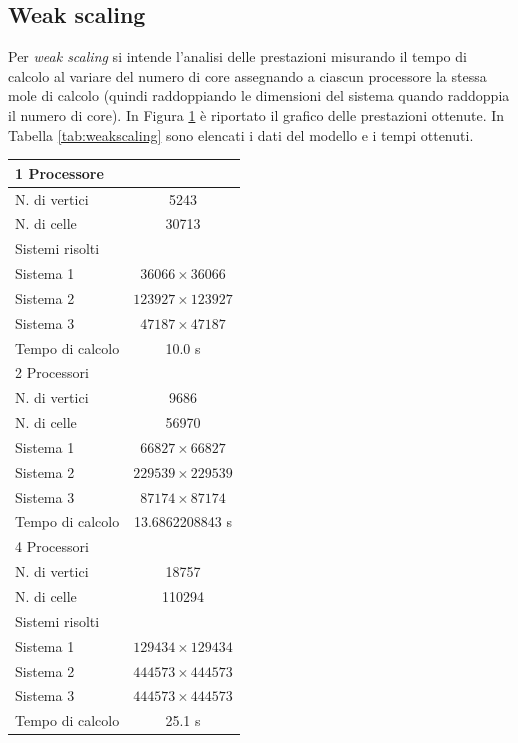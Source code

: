 \subsection{Weak scaling}
Per \textit{weak scaling} si intende l'analisi delle prestazioni misurando il tempo di calcolo al variare del numero di core assegnando a ciascun processore la stessa mole di calcolo (quindi raddoppiando le dimensioni del sistema quando raddoppia il numero di core). In Figura \ref{fig:weakscaling} è riportato il grafico delle prestazioni ottenute. In Tabella \ref{tab:weakscaling} sono elencati i dati del modello e i tempi ottenuti.
\begin{table}[p]
\centering
\begin{minipage}{0.45\textwidth}
\centering
\tiny
{}
\label{fig:weakscaling}

\end{minipage}
\begin{minipage}{0.45\textwidth}
\centering
\tiny
\begin{tabular}{lc}
\toprule
1 Processore&\\
\midrule
N. di vertici & 5243\\
N. di celle & 30713\\
Sistemi risolti&\\
Sistema 1 & $36066\times36066$\\
Sistema 2 & $123927\times123927$\\
Sistema 3 & $47187\times47187$\\
Tempo di calcolo & 10.0 s\\
\midrule
2 Processori&\\
\midrule
N. di vertici & 9686\\
N. di celle & 56970\\
Sistema 1 & $66827\times66827$\\
Sistema 2 & $229539\times229539$\\
Sistema 3 & $87174\times87174$\\
Tempo di calcolo & 13.6862208843 s\\
\midrule
4 Processori&\\
\midrule
N. di vertici & 18757\\
N. di celle & 110294\\
Sistemi risolti&\\
Sistema 1 & $129434\times129434$\\
Sistema 2 & $444573\times444573$\\
Sistema 3 & $444573\times444573$\\
Tempo di calcolo & 25.1 s\\


\end{tabular}
\end{minipage}
\end{table}
